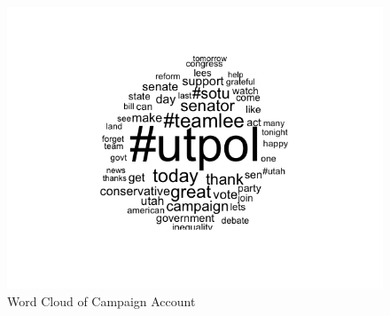 \documentclass{article}
\begin{document}
\begin{figure}[h!]
\includegraphics[width =\textwidth]{image/wordcloudcompaign.png}
\caption{Word Cloud of Campaign Account}
\end{figure}
\end{document}
